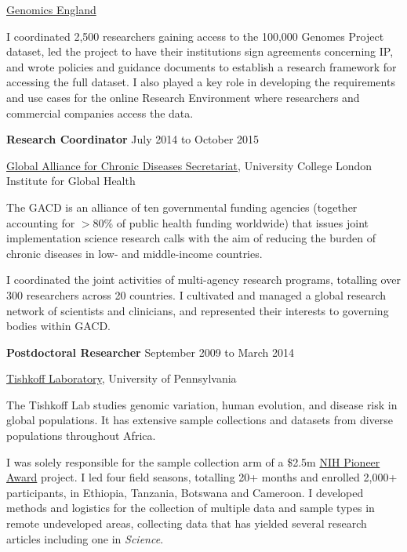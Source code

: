 \documentclass[10pt]{article}
\newcommand{\halfblankline}{\quad\vspace{-0.5\baselineskip}\pagebreak[3]}
\begin{document}
\href{http://www.genomicsengland.co.uk}{Genomics England}

\smallskip

I coordinated 2,500 researchers gaining access to the 100,000 Genomes Project dataset, led the project to have their institutions sign agreements concerning IP, and wrote policies and guidance documents to establish a research framework for accessing the full dataset. I also played a key role in developing the requirements and use cases for the online Research Environment where researchers and commercial companies access the data.

\halfblankline

\textbf{Research Coordinator} \hfill {July 2014 to October 2015}

\href{http://www.gacd.org}{Global Alliance for Chronic Diseases Secretariat}, University College London Institute for Global Health

\smallskip

The GACD is an alliance of ten governmental funding agencies (together accounting for $>$80\% of public health funding worldwide) that issues joint implementation science research calls with the aim of reducing the burden of chronic diseases in low- and middle-income countries.

I coordinated the joint activities of multi-agency research programs, totalling over 300 researchers across 20 countries. I cultivated and managed a global research network of scientists and clinicians, and represented their interests to governing bodies within GACD.

\halfblankline

\textbf{Postdoctoral Researcher} \hfill {September 2009 to March 2014}

\href{http://www.med.upenn.edu/tishkoff/index.html}{Tishkoff Laboratory}, University of Pennsylvania

\smallskip

The Tishkoff Lab studies genomic variation, human evolution, and disease risk in global populations. It has extensive sample collections and datasets from diverse populations throughout Africa.

I was solely responsible for the sample collection arm of a \${}2.5m  \href{https://commonfund.nih.gov/pioneer/}{NIH Pioneer Award} project.
I led four field seasons, totalling 20+ months and enrolled 2,000+ participants, in Ethiopia, Tanzania, Botswana and Cameroon.
I developed methods and logistics for the collection of multiple data and sample types in remote undeveloped areas, collecting data that has yielded several research articles including one in \emph{Science}.
\end{document}
